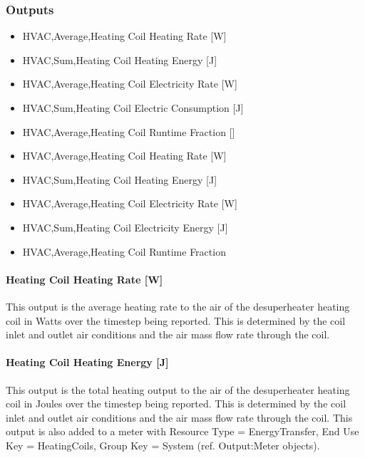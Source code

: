\subsubsection{Outputs}\label{outputs-4-006}

\begin{itemize}
\item
  HVAC,Average,Heating Coil Heating Rate {[}W{]}
\item
  HVAC,Sum,Heating Coil Heating Energy {[}J{]}
\item
  HVAC,Average,Heating Coil Electricity Rate {[}W{]}
\item
  HVAC,Sum,Heating Coil Electric Consumption {[}J{]}
\item
  HVAC,Average,Heating Coil Runtime Fraction {[]}
\item
  HVAC,Average,Heating Coil Heating Rate {[}W{]}
\item
  HVAC,Sum,Heating Coil Heating Energy {[}J{]}
\item
  HVAC,Average,Heating Coil Electricity Rate {[}W{]}
\item
  HVAC,Sum,Heating Coil Electricity Energy {[}J{]}
\item
  HVAC,Average,Heating Coil Runtime Fraction
\end{itemize}

\paragraph{Heating Coil Heating Rate {[}W{]}}\label{heating-coil-heating-rate-w-3}

This output is the average heating rate to the air of the desuperheater heating coil in Watts over the timestep being reported. This is determined by the coil inlet and outlet air conditions and the air mass flow rate through the coil.

\paragraph{Heating Coil Heating Energy {[}J{]}}\label{heating-coil-heating-energy-j-3}

This output is the total heating output to the air of the desuperheater heating coil in Joules over the timestep being reported. This is determined by the coil inlet and outlet air conditions and the air mass flow rate through the coil. This output is also added to a meter with Resource Type = EnergyTransfer, End Use Key = HeatingCoils, Group Key = System (ref. Output:Meter objects).

